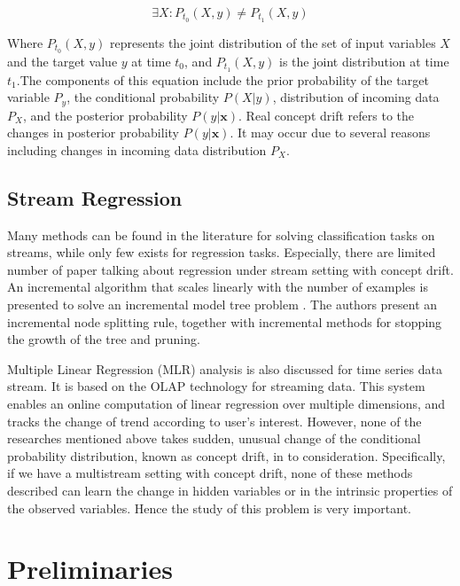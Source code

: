 \documentclass[conference,compsoc]{IEEEtran}
\begin{document}
\begin{equation}
   \exists X: P_{t_{0}}(X,{y}) \ne P_{t_{1}}(X,{y})
\end{equation} 

Where $P_{t_{0}}(X,{y})$ represents the joint distribution of the set of input variables $X$ and the target value $y$ at time $t_{0}$, and $P_{t_{1}}(X,{y})$ is the joint distribution at time $t_{1}$\cite{gama_survey}.The  
components of this equation include the prior probability of the target variable
$P_{y}$, the conditional probability $P(X \vert {y})$, distribution of incoming data $P_{X}$, and  the  posterior  probability $P(y \vert 
{\textbf{x}})$. Real concept drift refers  to  the  changes  in  posterior  probability $P(y \vert {\textbf{x}})$. It may occur due to several reasons including changes  in  incoming  data distribution $P_{X}$.
  
  

\subsection{Stream Regression}
Many methods can be found in the literature for solving classification tasks on streams, while only few exists for regression tasks. Especially, there are limited number of paper talking about regression under stream setting with concept drift. An incremental algorithm that scales linearly with the number of examples is presented to solve an incremental model tree problem \cite{Friedman}. The authors present an incremental node splitting rule, together with incremental methods for stopping the growth of the tree and pruning.

Multiple Linear Regression (MLR) analysis is also discussed for time series data stream. It is based on the OLAP technology  for streaming data. This system enables an online computation of linear regression over multiple dimensions, and tracks the change of trend according to user's interest. However, none of the researches mentioned above takes sudden, unusual change of the conditional probability distribution, known as concept drift, in to consideration. Specifically, if we have a multistream setting with concept drift, none of these methods described can learn the change in hidden variables or in the intrinsic properties of the observed variables. Hence the study of this problem is very important.




\section{Preliminaries}
\end{document}
